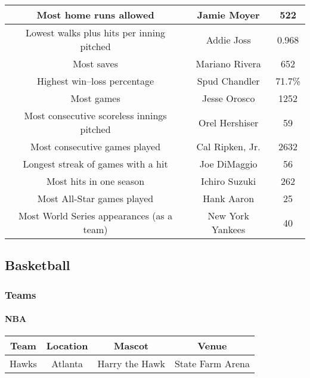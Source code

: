 \begin{center}
\begin{tabular}{|c|c|c|}
					\hline
					Most home runs allowed 	&	Jamie Moyer 	&	522	\\
					\hline
					Lowest walks plus hits per inning pitched 	&	Addie Joss 	&	0.968	\\
					\hline
					Most saves 	&	Mariano Rivera 	&	652	\\
					\hline
					Highest win–loss percentage 	&	Spud Chandler 	&	71.7\% 	\\
					\hline
					Most games 	&	Jesse Orosco 	&	1252	\\
					\hline
					Most consecutive scoreless innings pitched 	&	Orel Hershiser 	&	59\\
					\hline
					Most consecutive games played & Cal Ripken, Jr. & 2632 \\
					\hline
					Longest streak of games with a hit& Joe DiMaggio & 56 \\
					\hline
					Most hits in one season & Ichiro Suzuki& 262 \\
					\hline
					Most All-Star games played & Hank Aaron & 25 \\
					\hline
					Most World Series appearances (as a team)& New York Yankees &  40 \\
					\hline

				
					
				\end{tabular}
				\vspace{1 in}
			\end{center}			

			
			\newpage
		\subsection{Basketball}
			\subsubsection{Teams}
				\paragraph{NBA}
				\begin{center}
					\begin{tabular}{|c|c|c|c |}
						\hline
						\textbf{Team} & \textbf{Location} & \textbf{Mascot} & \textbf{Venue} \\
							\hline
						Hawks & Atlanta &  Harry the Hawk & State Farm Arena \\
						\hline
						
					\end{tabular}
				\end{center}				
				
